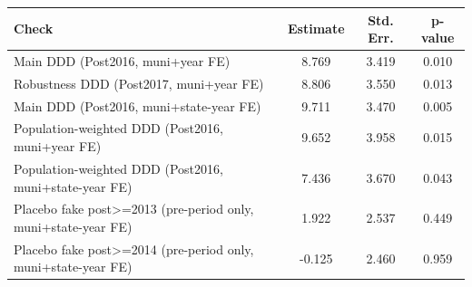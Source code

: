 \begin{tabular}{lccc}
\toprule
Check & Estimate & Std. Err. & p-value \\
\midrule
Main DDD (Post2016, muni+year FE) & 8.769 & 3.419 & 0.010 \\
Robustness DDD (Post2017, muni+year FE) & 8.806 & 3.550 & 0.013 \\
Main DDD (Post2016, muni+state-year FE) & 9.711 & 3.470 & 0.005 \\
Population-weighted DDD (Post2016, muni+year FE) & 9.652 & 3.958 & 0.015 \\
Population-weighted DDD (Post2016, muni+state-year FE) & 7.436 & 3.670 & 0.043 \\
Placebo fake post>=2013 (pre-period only, muni+state-year FE) & 1.922 & 2.537 & 0.449 \\
Placebo fake post>=2014 (pre-period only, muni+state-year FE) & -0.125 & 2.460 & 0.959 \\
\bottomrule
\end{tabular}
